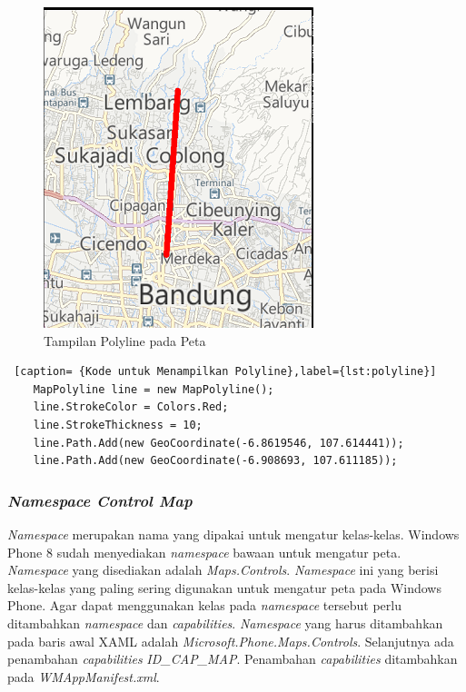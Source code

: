\begin{figure}[h]
	\centering
		\includegraphics[scale=0.5]{Gambar/kontrol/polyline}
	\caption{Tampilan Polyline pada Peta}
	\label{fig:TampilanpolylinepadaPeta}
\end{figure}

\begin{lstlisting} [caption= {Kode untuk Menampilkan Polyline},label={lst:polyline}]
	MapPolyline line = new MapPolyline();
	line.StrokeColor = Colors.Red;
	line.StrokeThickness = 10;
	line.Path.Add(new GeoCoordinate(-6.8619546, 107.614441));
	line.Path.Add(new GeoCoordinate(-6.908693, 107.611185));
\end{lstlisting}

\subsubsection{\textit{Namespace Control Map}}
\label{subsubsec:Namespace Control Map}
\hspace{0.5cm} \textit{Namespace} merupakan nama yang dipakai untuk mengatur kelas-kelas. Windows Phone 8 sudah menyediakan \textit{namespace} bawaan untuk mengatur peta. \textit{Namespace} yang disediakan adalah \textit{Maps.Controls}. \textit{Namespace} ini yang berisi kelas-kelas yang paling sering digunakan untuk mengatur peta pada Windows Phone.  Agar dapat menggunakan kelas pada \textit{namespace} tersebut perlu ditambahkan \textit{namespace} dan \textit{capabilities}. \textit{Namespace} yang harus ditambahkan pada baris awal XAML adalah \textit{Microsoft.Phone.Maps.Controls}. Selanjutnya ada penambahan \textit{capabilities} \textit{ID\_CAP\_MAP}. Penambahan \textit{capabilities} ditambahkan pada \textit{WMAppManifest.xml}.

